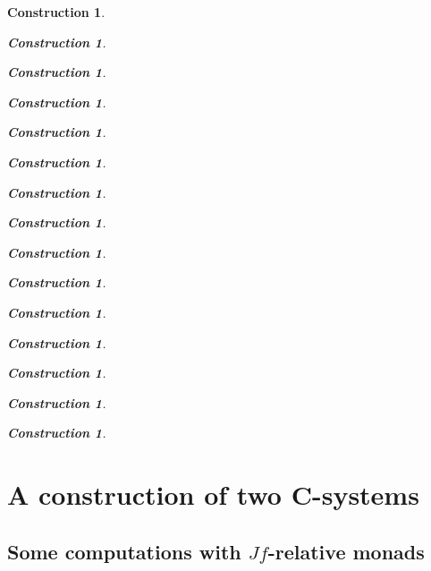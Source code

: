 \documentclass[onecolumn,12pt]{amsart}
\newtheorem{lemma}[proposition]{Lemma}
\numberwithin{proposition}{subsection}
\newtheorem{construction}[proposition]{Construction}
\newcommand{\sr}{\rightarrow}
\begin{document}
\begin{construction}
\begin{construction}
\begin{construction}
\begin{construction}
\begin{construction}
\begin{construction}
\begin{construction}
\begin{construction}
\begin{construction}
\begin{construction}
\begin{construction}
\begin{construction}
\begin{construction}
\begin{construction}
\begin{construction}




\section{A construction of two C-systems}\label{two-C-systems}

\subsection{Some computations with $Jf$-relative monads}
%
\label{Jfrel}
%


\end{construction}
\end{construction}
\end{construction}
\end{construction}
\end{construction}
\end{construction}
\end{construction}
\end{construction}
\end{construction}
\end{construction}
\end{construction}
\end{construction}
\end{construction}
\end{construction}
\end{construction}
\end{document}
